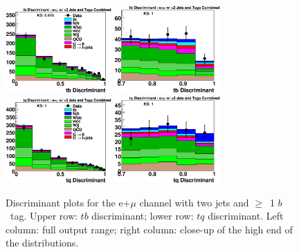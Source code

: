 \vspace{-0.05in}
\begin{figure}[!h!tbp]
\includegraphics[width=0.36\textwidth]
{figures/output/2jet/All_tb_Discriminant.eps}
\includegraphics[width=0.36\textwidth]
{figures/output/2jet/All_tb_Discriminant_Zoom.eps}
\includegraphics[width=0.36\textwidth]
{figures/output/2jet/All_tq_Discriminant.eps}
\includegraphics[width=0.36\textwidth]
{figures/output/2jet/All_tq_Discriminant_Zoom.eps}
\vspace{-0.1in}
\caption{Discriminant plots for the e+$\mu$ channel with two jets and
$\geq$~1 $b$~tag. Upper row: $tb$ discriminant; lower row: $tq$
discriminant. Left column: full output range; right column: close-up
of the high end of the distributions.}
\label{e21_2j}
\end{figure}

